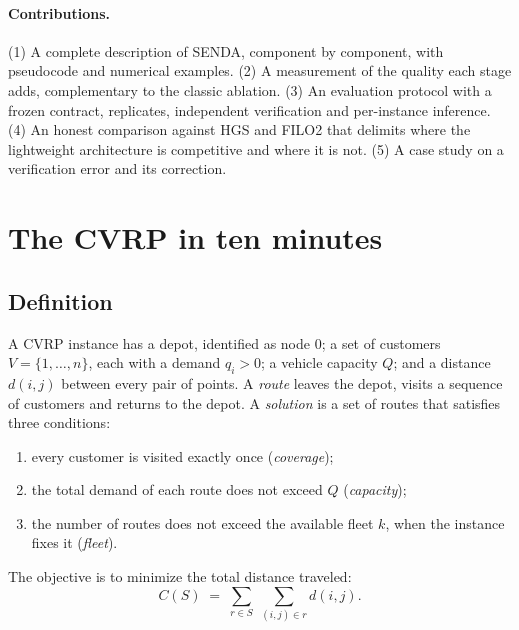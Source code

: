 \documentclass[11pt,a4paper]{article}
\newcommand{\senda}{SENDA}
\begin{document}
\paragraph{Contributions.}
(1) A complete description of \senda{}, component by component, with pseudocode and numerical
examples.
(2) A measurement of the quality each stage adds, complementary to the classic ablation.
(3) An evaluation protocol with a frozen contract, replicates, independent verification and
per-instance inference.
(4) An honest comparison against HGS and FILO2 that delimits where the lightweight architecture is
competitive and where it is not.
(5) A case study on a verification error and its correction.

\section{The CVRP in ten minutes}
\label{sec:cvrp}

\subsection{Definition}
A CVRP instance has a depot, identified as node $0$; a set of customers $V=\{1,\dots,n\}$, each with
a demand $q_i>0$; a vehicle capacity $Q$; and a distance $d(i,j)$ between every pair of points. A
\emph{route} leaves the depot, visits a sequence of customers and returns to the depot. A
\emph{solution} is a set of routes that satisfies three conditions:
\begin{enumerate}[label=(\roman*)]
\item every customer is visited exactly once (\emph{coverage});
\item the total demand of each route does not exceed $Q$ (\emph{capacity});
\item the number of routes does not exceed the available fleet $k$, when the instance fixes it
(\emph{fleet}).
\end{enumerate}
The objective is to minimize the total distance traveled:
\begin{equation}
C(S) \;=\; \sum_{r\in S}\;\sum_{(i,j)\in r} d(i,j).
\label{eq:costo}
\end{equation}
\end{document}
